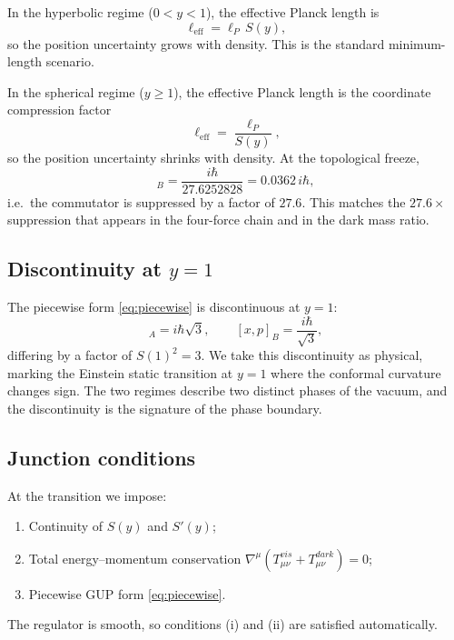 \documentclass[a4paper,1pt,oneside,openany]{book}
\begin{document}
In the hyperbolic regime ($0<y<1$), the effective Planck length 
is
\begin{equation}
\ell_{\text{eff}}=\ell_{P}\,S(y),
\label{eq:l-eff-hyp}
\end{equation}
so the position uncertainty grows with density. This is the 
standard minimum-length scenario.

In the spherical regime ($y\ge 1$), the effective Planck length 
is the coordinate compression factor
\begin{equation}
\ell_{\text{eff}}=\frac{\ell_{P}}{S(y)},
\label{eq:l-eff-sph}
\end{equation}
so the position uncertainty shrinks with density. At the 
topological freeze,
\begin{equation}
[x,p]_{B}=\frac{i\hbar}{27.6252828}=0.0362\,i\hbar,
\label{eq:comm-freeze}
\end{equation}
i.e.\ the commutator is suppressed by a factor of $27.6$. This 
matches the $27.6\times$ suppression that appears in the 
four-force chain and in the dark mass ratio.

\subsection{Discontinuity at \texorpdfstring{$y=1$}{y=1}}

The piecewise form \eqref{eq:piecewise} is discontinuous at 
$y=1$:
\begin{equation}
[x,p]_{A}=i\hbar\sqrt{3},
\qquad
[x,p]_{B}=\frac{i\hbar}{\sqrt{3}},
\label{eq:jump}
\end{equation}
differing by a factor of $S(1)^{2}=3$. We take this 
discontinuity as physical, marking the Einstein static 
transition at $y=1$ where the conformal curvature changes 
sign. The two regimes describe two distinct phases of the 
vacuum, and the discontinuity is the signature of the phase 
boundary.

\subsection{Junction conditions}

At the transition we impose:
\begin{enumerate}
\item Continuity of $S(y)$ and $S'(y)$;
\item Total energy--momentum conservation 
$\nabla^{\mu}(T_{\mu\nu}^{vis}+T_{\mu\nu}^{dark})=0$;
\item Piecewise GUP form \eqref{eq:piecewise}.
\end{enumerate}
The regulator is smooth, so conditions (i) and (ii) are 
satisfied automatically.
\end{document}
